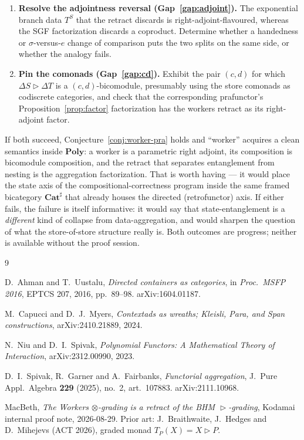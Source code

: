 \documentclass[11pt]{amsart}
\theoremstyle{plain}
\theoremstyle{definition}
\theoremstyle{gap}
\newcommand{\Poly}{\mathbf{Poly}}
\newcommand{\Cathash}{\mathbf{Cat}^{\sharp}}
\renewcommand{\lhd}{\vartriangleright}
\newcommand{\Store}[1]{\Delta #1}
\begin{document}
\begin{enumerate}
\item[(1)] \textbf{Resolve the adjointness reversal (Gap~\ref{gap:adjoint}).} The
exponential branch data $T^{S}$ that the retract discards is right-adjoint-flavoured,
whereas the SGF factorization discards a coproduct. Determine whether a handedness or
$\sigma$-versus-$e$ change of comparison puts the two splits on the same side, or
whether the analogy fails.
\item[(2)] \textbf{Pin the comonads (Gap~\ref{gap:cd}).} Exhibit the pair $(c,d)$ for
which $\Store{S}\lhd\Store{T}$ is a $(c,d)$-bicomodule, presumably using the store
comonads as codiscrete categories, and check that the corresponding prafunctor's
Proposition~\ref{prop:factor} factorization has the workers retract as its
right-adjoint factor.
\end{enumerate}

If both succeed, Conjecture~\ref{conj:worker-pra} holds and ``worker'' acquires a
clean semantics inside $\Poly$: a worker is a parametric right adjoint, its
composition is bicomodule composition, and the retract that separates entanglement
from nesting is the aggregation factorization. That is worth having --- it would place
the state axis of the compositional-correctness program inside the same framed
bicategory $\Cathash$ that already houses the directed (retrofunctor) axis. If either
fails, the failure is itself informative: it would say that state-entanglement is a
\emph{different} kind of collapse from data-aggregation, and would sharpen the
question of what the store-of-store structure really is. Both outcomes are progress;
neither is available without the proof session.

\begin{thebibliography}{9}

D.~Ahman and T.~Uustalu,
\emph{Directed containers as categories},
in \emph{Proc.\ MSFP 2016}, EPTCS 207, 2016, pp.~89--98.
arXiv:1604.01187.

M.~Capucci and D.~J.~Myers,
\emph{Contextads as wreaths; Kleisli, Para, and Span constructions},
arXiv:2410.21889, 2024.

N.~Niu and D.~I.~Spivak,
\emph{Polynomial Functors: A Mathematical Theory of Interaction},
arXiv:2312.00990, 2023.

D.~I.~Spivak, R.~Garner and A.~Fairbanks,
\emph{Functorial aggregation},
J.\ Pure Appl.\ Algebra \textbf{229} (2025), no.~2, art.~107883.
arXiv:2111.10968.

MacBeth,
\emph{The Workers $\otimes$-grading is a retract of the BHM $\lhd$-grading},
Kodamai internal proof note, 2026-08-29.
Prior art: J.~Braithwaite, J.~Hedges and D.~Mihejevs (ACT 2026), graded monad
$T_P(X)=X\lhd P$.

\end{thebibliography}
\end{document}
